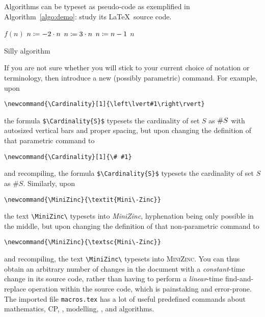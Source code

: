 Algorithms can be typeset as pseudo-code as exemplified in
Algorithm~\ref{algo:demo}: study its \LaTeX\ source code.

\begin{algorithm}[t]
  \begin{algorithmic}[1]  %
    \STATE \Function $f(n)$
      \STATE $n \coloneqq -2 \cdot n$ 
    \ELSE[$n \geq 0$]
      \STATE $n \coloneqq  3 \cdot n$
    \ENDIF
      \STATE $n \coloneqq n-1$
    \ENDWHILE
    \RETURN $n$
  \end{algorithmic}
  \caption{Silly algorithm}
  \label{algo:demo}
\end{algorithm}

If you are not sure whether you will stick to your current choice of
notation or terminology, then introduce a new (possibly parametric)
command.  For example, upon
\begin{center}
  \verb|\newcommand{\Cardinality}[1]{\left\lvert#1\right\rvert}|
\end{center}
the formula \verb|$\Cardinality{S}$| typesets the cardinality of set
$S$ as $\Cardinality{S}$ with autosized vertical bars and proper
spacing, but upon changing the definition of that parametric command
to
\begin{center}
  \verb|\newcommand{\Cardinality}[1]{\# #1}|
\end{center}
and recompiling, the formula \verb|$\Cardinality{S}$| typesets the
cardinality of set $S$ as $\#S$.
%
Similarly, upon
\begin{center}
  \verb|\newcommand{\MiniZinc}{\textit{Mini\-Zinc}}|
\end{center}
the text \verb|\MiniZinc\| typesets into \textit{MiniZinc},
hyphenation being only possible in the middle, but upon changing the
definition of that non-parametric command to
\begin{center}
  \verb|\newcommand{\MiniZinc}{\textsc{Mini\-Zinc}}|
\end{center}
and recompiling, the text \verb|\MiniZinc\| typesets into
\textsc{MiniZinc}.
%
You can thus obtain an arbitrary number of changes in the document
with a \emph{constant}-time change in its source code, rather than
having to perform a \emph{linear}-time find-and-replace operation
within the source code, which is painstaking and error-prone.  The
imported file \texttt{macros.tex} has a lot of useful predefined
commands about mathematics, CP, \Gecode, modelling, \MiniZinc, and
algorithms.

